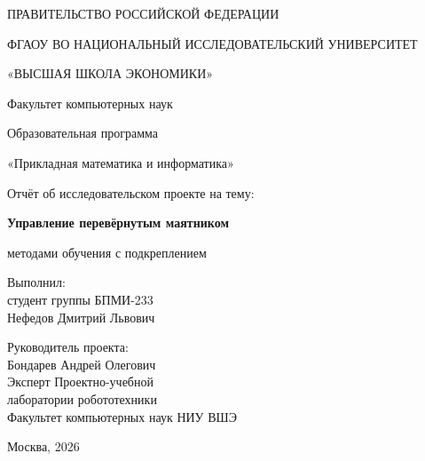 \documentclass[12pt,a4paper]{article}
\begin{document}
\begin{titlepage}
\centering
ПРАВИТЕЛЬСТВО РОССИЙСКОЙ ФЕДЕРАЦИИ\par
ФГАОУ ВО НАЦИОНАЛЬНЫЙ ИССЛЕДОВАТЕЛЬСКИЙ УНИВЕРСИТЕТ\par
«ВЫСШАЯ ШКОЛА ЭКОНОМИКИ»\par
\vspace{7mm}
Факультет компьютерных наук\par
Образовательная программа\par
«Прикладная математика и информатика»\par
\vspace{25mm}
Отчёт об исследовательском проекте на тему:\par
\vspace{5mm}
{\large\bfseries Управление перевёрнутым маятником\par
методами обучения с подкреплением\par}
\vspace{24mm}
\hfill\begin{minipage}{.58\linewidth}
Выполнил:\\студент группы БПМИ-233\\Нефедов Дмитрий Львович\par
\vspace{8mm}
Руководитель проекта:\\Бондарев Андрей Олегович\\
Эксперт Проектно-учебной\\лаборатории робототехники\\
Факультет компьютерных наук НИУ ВШЭ
\end{minipage}
\vfill Москва, 2026
\end{titlepage}
\setcounter{page}{2}
{\singlespacing\small\tableofcontents}







\clearpage{}
\renewcommand{\refname}{Список использованных источников}


\end{document}
